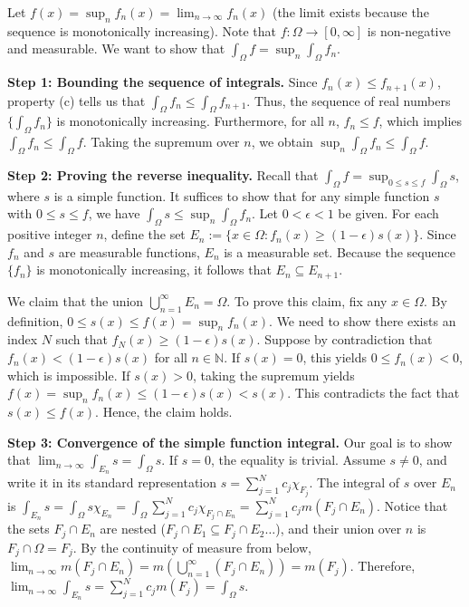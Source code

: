 \begin{pfbox}
    Let $f(x) = \sup_n f_n(x) = \displaystyle\lim_{n\to\infty} f_n(x)$ (the limit exists because the sequence is monotonically increasing). Note that $f: \Omega \rightarrow [0, \infty]$ is non-negative and measurable. We want to show that $\int_\Omega f = \displaystyle\sup_n \int_\Omega f_n$.

    \textbf{Step 1: Bounding the sequence of integrals.} 
    Since $f_n(x) \le f_{n+1}(x)$, property (c) tells us that $\int_\Omega f_n \le \int_\Omega f_{n+1}$. Thus, the sequence of real numbers $\{\int_\Omega f_n\}$ is monotonically increasing. Furthermore, for all $n$, $f_n \le f$, which implies $\int_\Omega f_n \le \int_\Omega f$. Taking the supremum over $n$, we obtain $\displaystyle\sup_n \int_\Omega f_n \le \int_\Omega f$.

    \textbf{Step 2: Proving the reverse inequality.} 
    Recall that $\int_\Omega f = \sup_{0 \le s \le f} \int_\Omega s$, where $s$ is a simple function. It suffices to show that for any simple function $s$ with $0 \le s \le f$, we have $\int_\Omega s \le \sup_n \int_\Omega f_n$.
    Let $0 < \epsilon < 1$ be given. For each positive integer $n$, define the set $E_n := \{x \in \Omega : f_n(x) \ge (1-\epsilon)s(x)\}$. Since $f_n$ and $s$ are measurable functions, $E_n$ is a measurable set. Because the sequence $\{f_n\}$ is monotonically increasing, it follows that $E_n \subseteq E_{n+1}$.
    
    We claim that the union $\displaystyle\bigcup_{n=1}^\infty E_n = \Omega$.
    To prove this claim, fix any $x \in \Omega$. By definition, $0 \le s(x) \le f(x) = \sup_n f_n(x)$. We need to show there exists an index $N$ such that $f_N(x) \ge (1-\epsilon)s(x)$.
    Suppose by contradiction that $f_n(x) < (1-\epsilon)s(x)$ for all $n \in \mathbb{N}$. If $s(x) = 0$, this yields $0 \le f_n(x) < 0$, which is impossible. If $s(x) > 0$, taking the supremum yields $f(x) = \sup_n f_n(x) \le (1-\epsilon)s(x) < s(x)$. This contradicts the fact that $s(x) \le f(x)$. Hence, the claim holds.

    \textbf{Step 3: Convergence of the simple function integral.} 
    Our goal is to show that $\displaystyle\lim_{n\to\infty} \int_{E_n} s = \int_\Omega s$.
    If $s = 0$, the equality is trivial. Assume $s \neq 0$, and write it in its standard representation $s = \displaystyle\sum_{j=1}^N c_j \chi_{F_j}$.
    The integral of $s$ over $E_n$ is $\int_{E_n} s = \int_\Omega s \chi_{E_n} = \int_\Omega \displaystyle\sum_{j=1}^N c_j \chi_{F_j \cap E_n} = \displaystyle\sum_{j=1}^N c_j m(F_j \cap E_n)$.
    Notice that the sets $F_j \cap E_n$ are nested ($F_j \cap E_1 \subseteq F_j \cap E_2 \dots$), and their union over $n$ is $F_j \cap \Omega = F_j$. By the continuity of measure from below, $\displaystyle\lim_{n\to\infty} m(F_j \cap E_n) = m\left(\displaystyle\bigcup_{n=1}^\infty (F_j \cap E_n)\right) = m(F_j)$.
    Therefore, $\displaystyle\lim_{n\to\infty} \int_{E_n} s = \displaystyle\sum_{j=1}^N c_j m(F_j) = \int_\Omega s$.


\end{pfbox}

